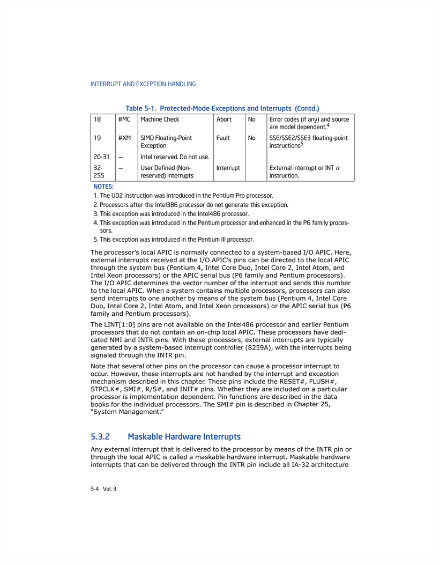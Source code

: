 \documentclass[aspectratio=169]{beamer}
\begin{document}
\begin{frame}
\begin{figure}
    \includegraphics[scale=0.65]{img/tabla_int2}
    \end{figure}
\end{frame}
\end{document}
